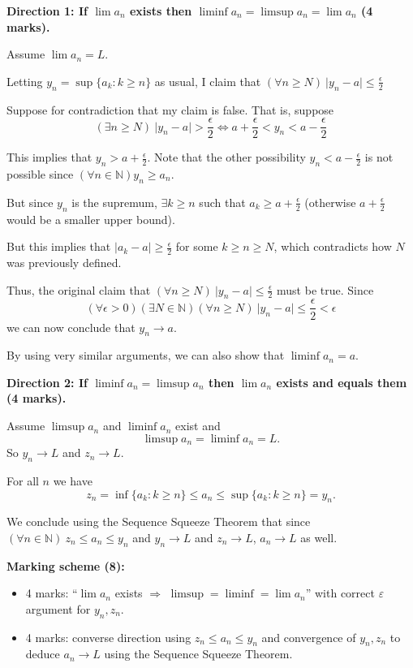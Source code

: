 \documentclass{article}
\begin{document}
\begin{enumerate}[label=(\alph*)]
\begin{mdframed}[linecolor=black, linewidth=1pt]
    \textbf{Direction 1: If $\lim a_n$ exists then $\liminf a_n = \limsup a_n = \lim a_n$ (4 marks).}

    Assume $\lim a_n = L$.
    
    Letting $y_n = \sup \{ a_k : k \ge n \}$ as usual, I claim that $(\forall n \ge N) \ \vert y_n - a \vert \le \frac{\epsilon}{2}$
    
    Suppose for contradiction that my claim is false. That is, suppose
    \[
    (\exists n \ge N) \ \vert y_n - a \vert > \frac{\epsilon}{2} \Longleftrightarrow a + \frac{\epsilon}{2} < y_n < a - \frac{\epsilon}{2}
    \]
    
    This implies that $y_n > a + \frac{\epsilon}{2}$. Note that the other possibility $y_n < a - \frac{\epsilon}{2}$ is not possible since $(\forall n \in \mathbb{N}) y_n \ge a_n$.
    
    But since $y_n$ is the supremum, $\exists k \ge n$ such that $a_k \ge a + \frac{\epsilon}{2}$ (otherwise $a + \frac{\epsilon}{2}$ would be a smaller upper bound).
    
    But this implies that $\vert a_k - a \vert \ge \frac{\epsilon}{2}$ for some $k \ge n \ge N$, which contradicts how $N$ was previously defined.
    
    Thus, the original claim that $(\forall n \ge N) \ \vert y_n - a \vert \le \frac{\epsilon}{2}$ must be true.
    Since
    \[
    (\forall \epsilon > 0)(\exists N \in \mathbb{N})(\forall n \ge N) \ \vert y_n - a \vert \le \frac{\epsilon}{2} < \epsilon
    \]
    we can now conclude that $y_n \rightarrow a$.

    By using very similar arguments, we can also show that $\liminf a_n = a$.
    
    \medskip
    \textbf{Direction 2: If $\liminf a_n = \limsup a_n$ then $\lim a_n$ exists and equals them (4 marks).}
    
    Assume $\limsup a_n$ and $\liminf a_n$ exist and
    \[
    \limsup a_n = \liminf a_n = L.
    \]
    So $y_n\to L$ and $z_n\to L$.
    
    For all $n$ we have
    \[
    z_n = \inf\{a_k : k \ge n\} \le a_n \le \sup \{a_k : k \ge n\} = y_n.
    \]
    
    We conclude using the Sequence Squeeze Theorem that since $(\forall n \in \mathbb{N}) \ z_n \le a_n \le y_n$ and $y_n \rightarrow L$ and $z_n \rightarrow L$, $a_n \rightarrow L$ as well.
    
    \medskip
    \textbf{Marking scheme (8):}
    \begin{itemize}
      \item 4 marks: ``$\lim a_n$ exists $\Rightarrow$ $\limsup=\liminf=\lim a_n$'' with correct $\varepsilon$ argument for $y_n,z_n$.
      \item 4 marks: converse direction using $z_n\le a_n\le y_n$ and convergence of $y_n,z_n$ to deduce $a_n\to L$ using the Sequence Squeeze Theorem.
    \end{itemize}
    \end{mdframed}
    

\end{enumerate}
\end{document}
